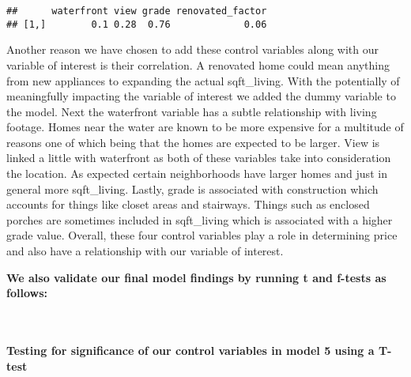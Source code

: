 \documentclass[
]{article}
\newenvironment{Shaded}{\begin{snugshade}}{\end{snugshade}}
\newcommand{\CommentTok}[1]{\textcolor[rgb]{0.56,0.35,0.01}{\textit{#1}}}
\newcommand{\DecValTok}[1]{\textcolor[rgb]{0.00,0.00,0.81}{#1}}
\newcommand{\KeywordTok}[1]{\textcolor[rgb]{0.13,0.29,0.53}{\textbf{#1}}}
\newcommand{\NormalTok}[1]{#1}
\newcommand{\OperatorTok}[1]{\textcolor[rgb]{0.81,0.36,0.00}{\textbf{#1}}}
\begin{document}
\begin{Shaded}
\end{Shaded}

\begin{verbatim}
##      waterfront view grade renovated_factor
## [1,]        0.1 0.28  0.76             0.06
\end{verbatim}

Another reason we have chosen to add these control variables along with
our variable of interest is their correlation. A renovated home could
mean anything from new appliances to expanding the actual sqft\_living.
With the potentially of meaningfully impacting the variable of interest
we added the dummy variable to the model. Next the waterfront variable
has a subtle relationship with living footage. Homes near the water are
known to be more expensive for a multitude of reasons one of which being
that the homes are expected to be larger. View is linked a little with
waterfront as both of these variables take into consideration the
location. As expected certain neighborhoods have larger homes and just
in general more sqft\_living. Lastly, grade is associated with
construction which accounts for things like closet areas and stairways.
Things such as enclosed porches are sometimes included in sqft\_living
which is associated with a higher grade value. Overall, these four
control variables play a role in determining price and also have a
relationship with our variable of interest.

\textbf{We also validate our final model findings by running t and
f-tests as follows:}

~

\hypertarget{testing-for-significance-of-our-control-variables-in-model-5-using-a-t-test}{%
\paragraph{\texorpdfstring{\textbf{Testing for significance of our
control variables in model 5 using a
T-test}}{Testing for significance of our control variables in model 5 using a T-test}}\label{testing-for-significance-of-our-control-variables-in-model-5-using-a-t-test}}
\end{document}
